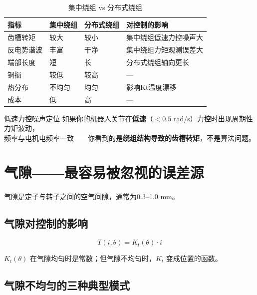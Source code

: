 \begin{table}[H]
\centering
\begin{tabular}{lp{3.5cm}p{3.5cm}p{3.5cm}}
\toprule
\textbf{指标} & \textbf{集中绕组} & \textbf{分布式绕组} & \textbf{对控制的影响} \\
\midrule
齿槽转矩 & 较大 & 较小 & 集中绕组低速力控噪声大 \\
反电势谐波 & 丰富 & 干净 & 集中绕组力矩观测误差大 \\
端部长度 & 短 & 长 & 分布式绕组轴向更长 \\
铜损 & 较低 & 较高 & --- \\
热分布 & 不均匀 & 均匀 & 影响Kt温度漂移 \\
成本 & 低 & 高 & --- \\
\bottomrule
\end{tabular}
\caption{集中绕组 vs 分布式绕组}
\label{tab:winding}
\end{table}

\begin{debugbox}{低速力控噪声定位}
如果你的机器人关节在\textbf{低速}（$< 0.5$ rad/s）力控时出现周期性力矩波动，\\
频率与电机电频率一致——你看到的是\textbf{绕组结构导致的齿槽转矩}，不是算法问题。
\end{debugbox}

\section{气隙——最容易被忽视的误差源}

气隙是定子与转子之间的空气间隙，通常为0.3--1.0 mm。

\subsection{气隙对控制的影响}

\begin{equation}
T(i, \theta) = K_t(\theta) \cdot i
\end{equation}

$K_t(\theta)$ 在气隙均匀时是常数；但气隙不均匀时，$K_t$ 变成位置的函数。

\subsection{气隙不均匀的三种典型模式}

